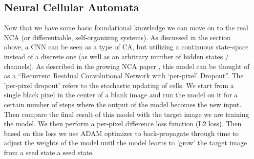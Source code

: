 \subsection{Neural Cellular Automata}

Now that we have some basic foundational knowledge we can move on to the real NCA (or differentiable, self-organizing systems). As discussed in the section above, a CNN can be seen as a type of CA, but utilizing a continuous state-space instead of a discrete one (as well as an arbitrary number of hidden states / channels). As described in the growing NCA paper , this model can be thought of as a “Recurrent Residual Convolutional Network with ‘per-pixel’ Dropout”. The 'per-pixel dropout' refers to the stochastic updating of cells. We start from a single black pixel in the center of a blank image and run the model on it for a certain number of steps where the output of the model becomes the new input. Then compare the final result of this model with the target image we are training the model. We then perform a per-pixel difference loss function (L2 loss). Then based on this loss we use ADAM optimizer to back-propagate through time to adjust the weights of the model until the model learns to 'grow' the target image from a seed state.a seed state.
